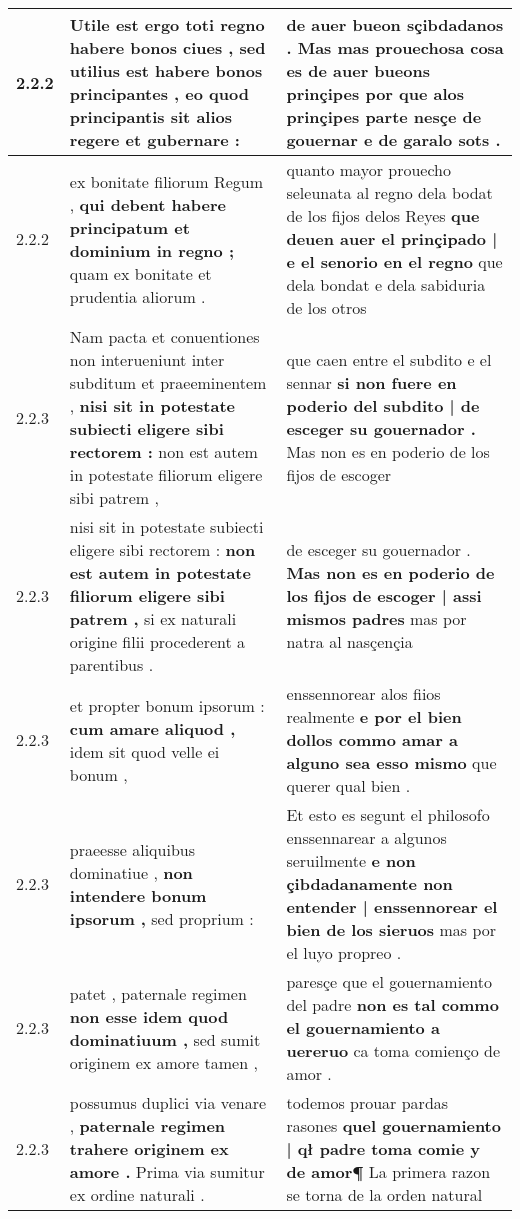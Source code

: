 \begin{tabular}{|p{1cm}|p{6.5cm}|p{6.5cm}|}
2.2.2 & Utile est ergo toti regno habere bonos ciues , \textbf{ sed utilius est habere bonos principantes , } eo quod principantis sit alios regere et gubernare : & de auer bueon sçibdadanos . \textbf{ Mas mas prouechosa cosa es de auer bueons prinçipes } por que alos prinçipes parte nesçe de gouernar e de garalo sots . \\\hline
2.2.2 & ex bonitate filiorum Regum , \textbf{ qui debent habere principatum et dominium in regno ; } quam ex bonitate et prudentia aliorum . & quanto mayor prouecho seleunata al regno dela bodat de los fijos delos Reyes \textbf{ que deuen auer el prinçipado | e el senorio en el regno } que dela bondat e dela sabiduria de los otros \\\hline
2.2.3 & Nam pacta et conuentiones non interueniunt inter subditum et praeeminentem , \textbf{ nisi sit in potestate subiecti eligere sibi rectorem : } non est autem in potestate filiorum eligere sibi patrem , & que caen entre el subdito e el sennar \textbf{ si non fuere en poderio del subdito | de esceger su gouernador . } Mas non es en poderio de los fijos de escoger \\\hline
2.2.3 & nisi sit in potestate subiecti eligere sibi rectorem : \textbf{ non est autem in potestate filiorum eligere sibi patrem , } si ex naturali origine filii procederent a parentibus . & de esceger su gouernador . \textbf{ Mas non es en poderio de los fijos de escoger | assi mismos padres } mas por natra al nasçençia \\\hline
2.2.3 & et propter bonum ipsorum : \textbf{ cum amare aliquod , } idem sit quod velle ei bonum , & enssennorear alos fiios realmente \textbf{ e por el bien dollos commo amar a alguno sea esso mismo } que querer qual bien . \\\hline
2.2.3 & praeesse aliquibus dominatiue , \textbf{ non intendere bonum ipsorum , } sed proprium : & Et esto es segunt el philosofo enssennarear a algunos seruilmente \textbf{ e non çibdadanamente non entender | enssennorear el bien de los sieruos } mas por el luyo propreo . \\\hline
2.2.3 & patet , paternale regimen \textbf{ non esse idem quod dominatiuum , } sed sumit originem ex amore tamen , & paresçe que el gouernamiento del padre \textbf{ non es tal commo el gouernamiento a uereruo } ca toma comienço de amor . \\\hline
2.2.3 & possumus duplici via venare , \textbf{ paternale regimen trahere originem ex amore . } Prima via sumitur ex ordine naturali . & todemos prouar pardas rasones \textbf{ quel gouernamiento | qł padre toma comie y de amor¶ } La primera razon se torna de la orden natural \\\hline

\end{tabular}
